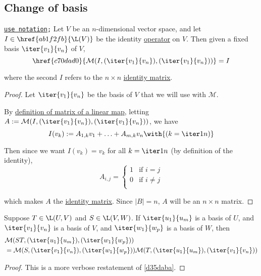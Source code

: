\subsection{Change of basis}\label{e05f938}

\label{a43a301}

\texttt{\href{d76dfe6}{use notation};} Let $V$ be an $n$-dimensional vector
space, and let $I\in\href{ab1f2fb}{\L(V)}$ be the identity
\href{bd31d9c}{operator} on $V$. Then given a fixed basis $\iter{v_1}{v_n}$ of $V$,
$$
  \href{c70dad0}{\mathcal M(I,(\iter{v_1}{v_n}),(\iter{v_1}{v_n}))}=I
$$

where the second $I$ refers to the $n\times n$ \href{dcfd9cd}{identity matrix}.

\begin{proof}
  Let $\iter{v_1}{v_n}$ be the basis of $V$ that we will use with $\mathcal
  M$.

  By \href{c70dad0}{definition of matrix of a linear map}, letting $A:=\mathcal
  M(I,(\iter{v_1}{v_n}),(\iter{v_1}{v_n}))$, we have
  $$
    I(v_k):=A_{1,k}v_1+\ldots+A_{m,k}v_n\with{(k=\iter1n)}
  $$

  Then since we want $I(v_k)=v_k$ for all $k=\iter1n$ (by definition of the
  identity),
  $$
    A_{i,j}=\begin{cases}
      1 & \text{if }i=j     \\
      0 & \text{if }i\neq j \\
    \end{cases}
  $$

  which makes $A$ the \href{dcfd9cd}{identity matrix}. Since $|B|=n$, $A$ will
  be an $n\times n$ matrix.
\end{proof}

\label{d17fea1}

Suppose $T\in\L(U,V)$ and $S\in\L(V,W)$. If $\iter{u_1}{u_m}$ is a basis of
$U$, and $\iter{v_1}{v_n}$ is a basis of $V$, and $\iter{w_1}{w_p}$ is a basis
of $W$, then
\begin{align*}
   &\mathcal M(ST,(\iter{u_1}{u_m}),(\iter{w_1}{w_p})) \\
   &=\mathcal M(S,(\iter{v_1}{v_n}),(\iter{w_1}{w_p}))
  \mathcal M(T,(\iter{u_1}{u_m}),(\iter{v_1}{v_n}))
\end{align*}

\begin{proof}
  This is a more verbose restatement of \autoref{d35daba}.
\end{proof}

